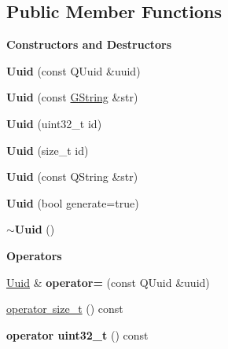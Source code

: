 \subsection*{Public Member Functions}
\begin{Indent}\textbf{ Constructors and Destructors}\par
\begin{DoxyCompactItemize}
\item 
\mbox{\label{classrev_1_1_uuid_a67e068a002b2950cfef1f3b564db5105}} 
{\bfseries Uuid} (const Q\+Uuid \&uuid)
\item 
\mbox{\label{classrev_1_1_uuid_a706121a1fc14c18136986302afd0fc03}} 
{\bfseries Uuid} (const \mbox{\hyperlink{classrev_1_1_g_string}{G\+String}} \&str)
\item 
\mbox{\label{classrev_1_1_uuid_aba44251849bd621853b82b225f0943bf}} 
{\bfseries Uuid} (uint32\+\_\+t id)
\item 
\mbox{\label{classrev_1_1_uuid_ab0f96d6f70cca94183edfc87c5237022}} 
{\bfseries Uuid} (size\+\_\+t id)
\item 
\mbox{\label{classrev_1_1_uuid_a07d889ebe8486bda789c09493bdddafc}} 
{\bfseries Uuid} (const Q\+String \&str)
\item 
\mbox{\label{classrev_1_1_uuid_a798fc041c206c0cf17edf5c1f54faa1c}} 
{\bfseries Uuid} (bool generate=true)
\item 
\mbox{\label{classrev_1_1_uuid_ae554437653d85e28f5dbac9e2b2f94fb}} 
{\bfseries $\sim$\+Uuid} ()
\end{DoxyCompactItemize}
\end{Indent}
\begin{Indent}\textbf{ Operators}\par
\begin{DoxyCompactItemize}
\item 
\mbox{\label{classrev_1_1_uuid_a87a64751397051de460f744db0070bef}} 
\mbox{\hyperlink{classrev_1_1_uuid}{Uuid}} \& {\bfseries operator=} (const Q\+Uuid \&uuid)
\item 
\mbox{\hyperlink{classrev_1_1_uuid_ad6a1edca9a420a819804844104e51908}{operator size\+\_\+t}} () const
\item 
\mbox{\label{classrev_1_1_uuid_a40bb850f70851698fc13b4329e715b0f}} 
{\bfseries operator uint32\+\_\+t} () const
\end{DoxyCompactItemize}
\end{Indent}
